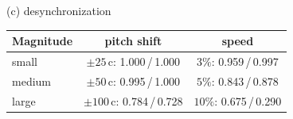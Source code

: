 \begin{table}[t]
\begin{minipage}[t]{0.35\linewidth}
\centering
{\footnotesize (c) desynchronization\par}\vspace{2pt}
\setlength{\tabcolsep}{3pt}
\begin{tabular}{@{}l c c@{}}
\toprule
Magnitude & pitch shift & speed \\
\midrule
small  & $\pm25$\,c: 1.000\,/\,1.000  & $3\%$: 0.959\,/\,0.997 \\
medium & $\pm50$\,c: 0.995\,/\,1.000  & $5\%$: 0.843\,/\,0.878 \\
large  & $\pm100$\,c: 0.784\,/\,0.728 & $10\%$: 0.675\,/\,0.290 \\
\bottomrule
\end{tabular}
\end{minipage}
\end{table}
